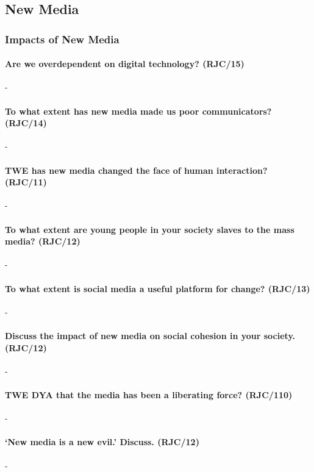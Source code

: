 \documentclass[../../main]{subfiles}
\begin{document}
\subsection{New Media}

\subsubsection{Impacts of New Media}


\paragraph{Are we overdependent on digital technology? (RJC/15)}-

\paragraph{To what extent has new media made us poor communicators? (RJC/14)}-

\paragraph{TWE has new media changed the face of human interaction? (RJC/11)}-

\paragraph{To what extent are young people in your society slaves to the mass media? (RJC/12)}-


\paragraph{To what extent is social media a useful platform for change? (RJC/13)}-

\paragraph{Discuss the impact of new media on social cohesion in your society. (RJC/12)}-

\paragraph{TWE DYA that the media has been a liberating force? (RJC/110)}-


\paragraph{`New media is a new evil.' Discuss. (RJC/12)}-
\end{document}
